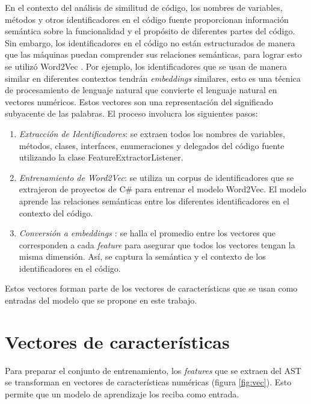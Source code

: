 En el contexto del análisis de similitud de código, los nombres de variables, métodos y otros identificadores en el código fuente proporcionan información semántica sobre la funcionalidad y el propósito de diferentes partes del código. Sin embargo, los identificadores en el código no están estructurados de manera que las máquinas puedan comprender sus relaciones semánticas, para lograr esto se utilizó Word2Vec \cite{mikolov2013efficient}. Por ejemplo, los identificadores que se usan de manera similar en diferentes contextos tendrán \textit{embeddings} similares, esto es una técnica de procesamiento de lenguaje natural que convierte el lenguaje natural en vectores numéricos. Estos vectores son una representación del significado subyacente de las palabras.
  El proceso involucra los siguientes pasos:
\begin{enumerate}
	\item \textit{Extracción de Identificadores}: se extraen todos los nombres de variables, métodos, clases, interfaces, enumeraciones y delegados del código fuente utilizando la clase FeatureExtractorListener.
	
	\item \textit{Entrenamiento de Word2Vec}: se utiliza un corpus de identificadores que se extrajeron de proyectos de C\# para entrenar el modelo Word2Vec. El modelo aprende las relaciones semánticas \cite{saini2021learning} entre los diferentes identificadores en el contexto del código.
	
	\item \textit{Conversión a \textit{embeddings} \cite{mikolov2013efficient}}: se halla el promedio entre los vectores que corresponden a cada \textit{feature} para asegurar que todos los vectores tengan la misma dimensión. Así, se captura la semántica y el contexto de los identificadores en el código.
	 
\end{enumerate}


Estos vectores forman parte de los vectores de características que se usan como entradas del modelo que se propone en este trabajo.


\section{Vectores de características} \label{sec:vec}
Para preparar el conjunto de entrenamiento, los \textit{features} que se extraen del AST se transforman en vectores de características numéricas (figura \ref{fig:vec}). Esto permite que un modelo de aprendizaje los reciba como entrada. 


